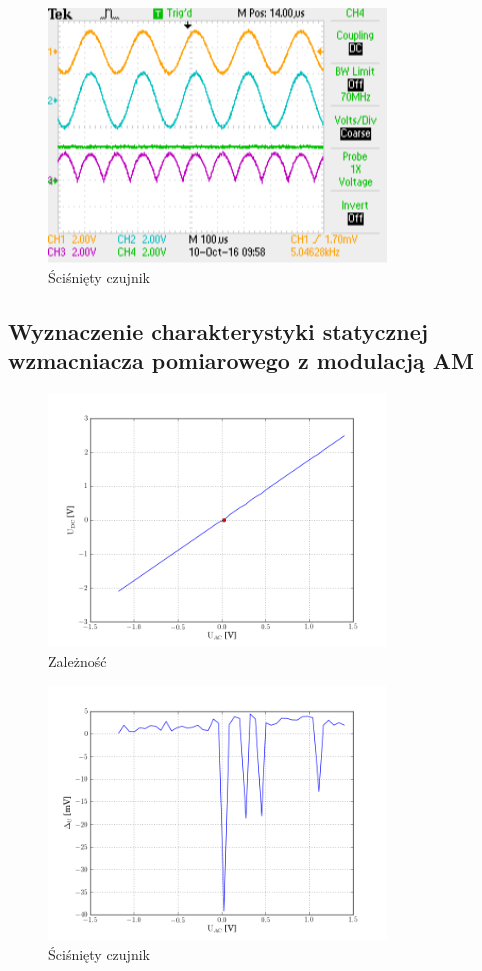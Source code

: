 \documentclass[a4paper, 12pt, titlepage]{article}
\begin{document}
				\begin{figure}[H]
					\centering
					\includegraphics[width=0.8\textwidth]{./img/rozciagniete.png}
					\caption{\small{Ściśnięty czujnik}}
				\end{figure} \noindent
		\subsection{Wyznaczenie charakterystyki statycznej wzmacniacza pomiarowego z modulacją AM}
			\begin{figure}[H]
				\centering
				\includegraphics[width=0.8\textwidth]{./img/Uac_od_Udc.png}
				\caption{\small{Zależność }}
			\end{figure} \noindent
			\begin{figure}[H]
				\centering
				\includegraphics[width=0.8\textwidth]{./img/Uac_Udc_blad.png}
				\caption{\small{Ściśnięty czujnik}}
			\end{figure} \noindent
\end{document}
